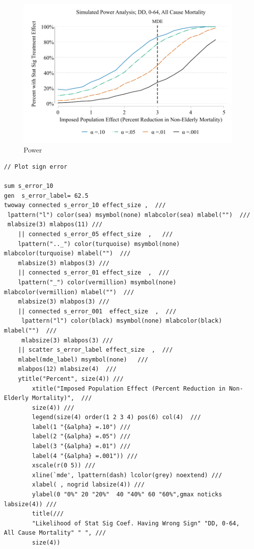 \documentclass[12pt]{article}%
\begin{document}
\begin{appendices}
\FloatBarrier
\begin{figure}
  \caption{Power}
      \includegraphics[width=\linewidth]{../state_level_public_data_example/output/simulated_power_analysis.pdf}  
\end{figure}
\FloatBarrier
\begin{footnotesize}
\begin{verbatim} 
// Plot sign error

sum s_error_10
gen  s_error_label= 62.5
twoway connected s_error_10 effect_size ,  /// 
 lpattern("l") color(sea) msymbol(none) mlabcolor(sea) mlabel("")  /// 
 mlabsize(3) mlabpos(11) ///
    || connected s_error_05 effect_size  ,   ///
    lpattern(".._") color(turquoise) msymbol(none) mlabcolor(turquoise) mlabel("")  /// 
    mlabsize(3) mlabpos(3) ///
    || connected s_error_01 effect_size  ,  /// 
    lpattern("_") color(vermillion) msymbol(none) mlabcolor(vermillion) mlabel("")  /// 
    mlabsize(3) mlabpos(3) ///
    || connected s_error_001  effect_size  ,  ///
     lpattern("l") color(black) msymbol(none) mlabcolor(black) mlabel("")  /// 
     mlabsize(3) mlabpos(3) ///
    || scatter s_error_label effect_size  ,  /// 
    mlabel(mde_label) msymbol(none)   /// 
    mlabpos(12) mlabsize(4)  ///
    ytitle("Percent", size(4)) ///
        xtitle("Imposed Population Effect (Percent Reduction in Non-Elderly Mortality)",  /// 
        size(4)) ///
        legend(size(4) order(1 2 3 4) pos(6) col(4)  /// 
        label(1 "{&alpha} =.10") ///
        label(2 "{&alpha} =.05") ///
        label(3 "{&alpha} =.01") ///
        label(4 "{&alpha} =.001")) ///
        xscale(r(0 5)) ///
        xline(`mde', lpattern(dash) lcolor(grey) noextend) ///
        xlabel( , nogrid labsize(4)) ///
        ylabel(0 "0%" 20 "20%"  40 "40%" 60 "60%",gmax noticks labsize(4)) ///
        title(///
        "Likelihood of Stat Sig Coef. Having Wrong Sign" "DD, 0-64, All Cause Mortality" " ", ///
        size(4))


\end{verbatim}
\end{footnotesize}
\end{appendices}
\end{document}
